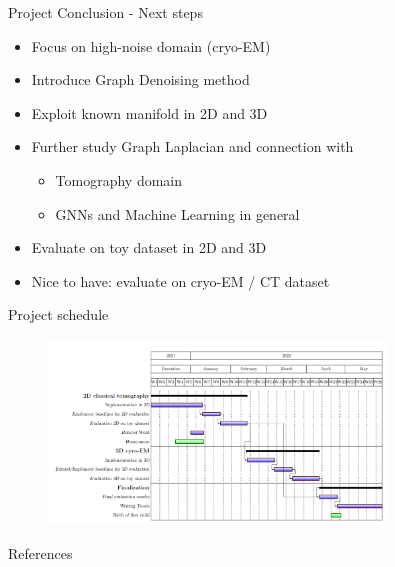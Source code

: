 \documentclass[aspectratio=169]{beamer}
\begin{document}
\begin{frame}{Project Conclusion - Next steps}
    \begin{itemize}
        \item Focus on high-noise domain (cryo-EM)
        \item Introduce Graph Denoising method
        \item Exploit known manifold in 2D and 3D
        \item Further study Graph Laplacian and connection with
            \begin{itemize}
                \item Tomography domain
                \item GNNs and Machine Learning in general
            \end{itemize}
        \item Evaluate on toy dataset in 2D and 3D
        \item Nice to have: evaluate on cryo-EM / CT dataset
    \end{itemize}
\end{frame}

\begin{frame}{Project schedule}
    \begin{figure}
        \includegraphics[width=0.8\textwidth]{gantt_chart}
    \end{figure}
\end{frame}

\begin{frame}[t,plain]
\end{frame}

\backupbegin

\begin{frame}{References}
    \printbibliography
\end{frame}

\backupend
\end{document}
